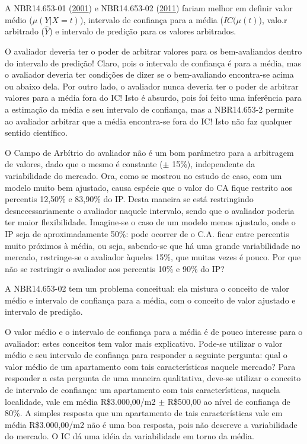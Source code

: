 \documentclass[a4paper, 12pt]{article}
\begin{document}
A NBR14.653-01 (\protect\hyperlink{ref-NBR1465301}{2001}) e NBR14.653-02
(\protect\hyperlink{ref-NBR1465302}{2011}) fariam melhor em definir
valor médio (\(\mu(Y| X= t)\)), intervalo de confiança para a média
(\(IC(\mu(t)\)), valo.r arbitrado (\(\hat Y\)) e intervalo de predição
para os valores arbitrados.

O avaliador deveria ter o poder de arbitrar valores para os
bem-avaliandos dentro do intervalo de predição! Claro, pois o intervalo
de confiança é para a média, mas o avaliador deveria ter condições de
dizer se o bem-avaliando encontra-se acima ou abaixo dela. Por outro
lado, o avaliador nunca deveria ter o poder de arbitrar valores para a
média fora do IC! Isto é absurdo, pois foi feito uma inferência para a
estimação da média e seu intervalo de confiança, mas a NBR14.653-2
permite ao avaliador arbitrar que a média encontra-se fora do IC! Isto
não faz qualquer sentido científico.

O Campo de Arbítrio do avaliador não é um bom parâmetro para a
arbitragem de valores, dado que o mesmo é constante (\(\pm\) 15\%),
independente da variabilidade do mercado. Ora, como se mostrou no estudo
de caso, com um modelo muito bem ajustado, causa espécie que o valor do
CA fique restrito aos percentis 12,50\% e 83,90\% do IP. Desta maneira
se está restringindo desnecessariamente o avaliador naquele intervalo,
sendo que o avaliador poderia ter maior flexibilidade. Imagine-se o caso
de um modelo menos ajustado, onde o IP seja de aproximadamente 50\%:
pode ocorrer de o C.A. ficar entre percentis muito próximos à média, ou
seja, sabendo-se que há uma grande variabilidade no mercado,
restringe-se o avaliador àqueles 15\%, que muitas vezes é pouco. Por que
não se restringir o avaliador aos percentis 10\% e 90\% do IP?

A NBR14.653-02 tem um problema conceitual: ela mistura o conceito de
valor médio e intervalo de confiança para a média, com o conceito de
valor ajustado e intervalo de predição.

O valor médio e o intervalo de confiança para a média é de pouco
interesse para o avaliador: estes conceitos tem valor mais explicativo.
Pode-se utilizar o valor médio e seu intervalo de confiança para
responder a seguinte pergunta: qual o valor médio de um apartamento com
tais características naquele mercado? Para responder a esta pergunta de
uma maneira qualitativa, deve-se utilizar o conceito de intervalo de
confiança: um apartamento com tais características, naquela localidade,
vale em média R\$3.000,00/m2 \(\pm\) R\$500,00 ao nível de confiança de
80\%. A simples resposta que um apartamento de tais características vale
em média R\$3.000,00/m2 não é uma boa resposta, pois não descreve a
variabilidade do mercado. O IC dá uma idéia da variabilidade em torno da
média.
\end{document}
